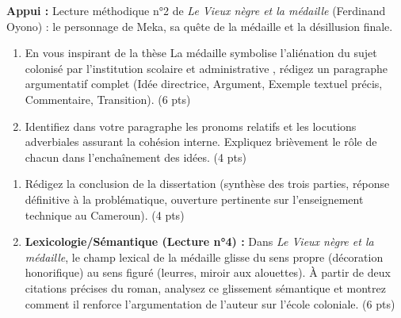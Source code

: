 \documentclass[11pt]{article}
\begin{document}
\begin{exercice}
\textbf{Appui :} Lecture méthodique n°2 de \textit{Le Vieux nègre et la médaille} (Ferdinand Oyono) : le personnage de Meka, sa quête de la médaille et la désillusion finale.
\begin{enumerate}
    \item En vous inspirant de la thèse \og La médaille symbolise l'aliénation du sujet colonisé par l'institution scolaire et administrative \fg{}, rédigez un paragraphe argumentatif complet (Idée directrice, Argument, Exemple textuel précis, Commentaire, Transition). (6 pts)
    \item Identifiez dans votre paragraphe les pronoms relatifs et les locutions adverbiales assurant la cohésion interne. Expliquez brièvement le rôle de chacun dans l'enchaînement des idées. (4 pts)
\end{enumerate}
\end{exercice}

\begin{exercice}
\begin{enumerate}
    \item Rédigez la conclusion de la dissertation (synthèse des trois parties, réponse définitive à la problématique, ouverture pertinente sur l'enseignement technique au Cameroun). (4 pts)
    \item \textbf{Lexicologie/Sémantique (Lecture n°4) :} Dans \textit{Le Vieux nègre et la médaille}, le champ lexical de la \og médaille \fg{} glisse du sens propre (décoration honorifique) au sens figuré (leurres, miroir aux alouettes). À partir de deux citations précises du roman, analysez ce glissement sémantique et montrez comment il renforce l'argumentation de l'auteur sur l'école coloniale. (6 pts)
\end{enumerate}
\end{exercice}
\end{document}

